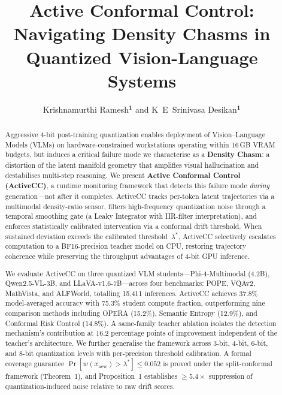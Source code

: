 \documentclass{ieeetmlcn}
\def\authorrefmark#1{\ensuremath{^{\textbf{#1}}}}
\begin{document}


\title{Active Conformal Control: Navigating Density Chasms in Quantized Vision-Language Systems}

\author{Krishnamurthi Ramesh\authorrefmark{1} and
        K~E~Srinivasa Desikan\authorrefmark{1}}


\begin{abstract}
Aggressive 4-bit post-training quantization enables deployment of
Vision--Language Models (VLMs) on hardware-constrained workstations
operating within 16\,GB VRAM budgets, but induces a critical failure mode
we characterise as a \textbf{Density Chasm}: a distortion of the latent
manifold geometry that amplifies visual hallucination and destabilises
multi-step reasoning. We present \textbf{Active Conformal Control
(ActiveCC)}, a runtime monitoring framework that detects this failure
mode \emph{during} generation---not after it completes. ActiveCC tracks
per-token latent trajectories via a multimodal density-ratio sensor,
filters high-frequency quantization noise through a temporal smoothing
gate (a Leaky Integrator with IIR-filter interpretation), and enforces
statistically calibrated intervention via a conformal drift threshold.
When sustained deviation exceeds the calibrated threshold~$\lambda^*$,
ActiveCC selectively escalates computation to a BF16-precision teacher
model on CPU, restoring trajectory coherence while preserving the
throughput advantages of 4-bit GPU inference.

We evaluate ActiveCC on three quantized VLM students---Phi-4-Multimodal
(4.2B), Qwen2.5-VL-3B, and LLaVA-v1.6-7B---across four benchmarks:
POPE, VQAv2, MathVista, and ALFWorld, totalling 15,411 inferences.
ActiveCC achieves 37.8\% model-averaged accuracy with 75.3\% student
compute fraction, outperforming nine comparison methods including OPERA
(15.2\%), Semantic Entropy (12.9\%), and Conformal Risk Control
(14.8\%). A same-family teacher ablation isolates the detection
mechanism's contribution at 16.2 percentage points of improvement
independent of the teacher's architecture. We further generalise the
framework across 3-bit, 4-bit, 6-bit, and 8-bit quantization levels with
per-precision threshold calibration. A formal coverage guarantee
$\Pr[w(x_{\text{new}})\!>\!\lambda^*]\leq 0.052$ is proved under the
split-conformal framework (Theorem~1), and Proposition~1 establishes
$\geq 5.4\times$ suppression of quantization-induced noise relative to
raw drift scores.
\end{abstract}
\end{document}

